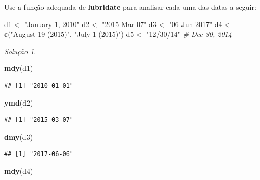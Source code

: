 \documentclass[
]{latex/krantz}
\newenvironment{Shaded}{\begin{snugshade}}{\end{snugshade}}
\newcommand{\CommentTok}[1]{\textcolor[rgb]{0.56,0.35,0.01}{\textit{#1}}}
\newcommand{\FunctionTok}[1]{\textcolor[rgb]{0.13,0.29,0.53}{\textbf{#1}}}
\newcommand{\NormalTok}[1]{#1}
\newcommand{\OtherTok}[1]{\textcolor[rgb]{0.56,0.35,0.01}{#1}}
\newcommand{\StringTok}[1]{\textcolor[rgb]{0.31,0.60,0.02}{#1}}
\theoremstyle{definition}
\theoremstyle{definition}
\theoremstyle{definition}
\theoremstyle{definition}
\theoremstyle{remark}
\newtheorem*{solution}{Solução}
\begin{document}
Use a função adequada de \textbf{lubridate} para analisar cada uma das datas a seguir:

\begin{Shaded}
\begin{Highlighting}[]
\NormalTok{d1 }\OtherTok{\textless{}{-}} \StringTok{"January 1, 2010"}
\NormalTok{d2 }\OtherTok{\textless{}{-}} \StringTok{"2015{-}Mar{-}07"}
\NormalTok{d3 }\OtherTok{\textless{}{-}} \StringTok{"06{-}Jun{-}2017"}
\NormalTok{d4 }\OtherTok{\textless{}{-}} \FunctionTok{c}\NormalTok{(}\StringTok{"August 19 (2015)"}\NormalTok{, }\StringTok{"July 1 (2015)"}\NormalTok{)}
\NormalTok{d5 }\OtherTok{\textless{}{-}} \StringTok{"12/30/14"} \CommentTok{\# Dec 30, 2014}
\end{Highlighting}
\end{Shaded}

\begin{solution}
\leavevmode

\begin{Shaded}
\begin{Highlighting}[]
\FunctionTok{mdy}\NormalTok{(d1)}
\end{Highlighting}
\end{Shaded}

\begin{verbatim}
## [1] "2010-01-01"
\end{verbatim}

\begin{Shaded}
\begin{Highlighting}[]
\FunctionTok{ymd}\NormalTok{(d2)}
\end{Highlighting}
\end{Shaded}

\begin{verbatim}
## [1] "2015-03-07"
\end{verbatim}

\begin{Shaded}
\begin{Highlighting}[]
\FunctionTok{dmy}\NormalTok{(d3)}
\end{Highlighting}
\end{Shaded}

\begin{verbatim}
## [1] "2017-06-06"
\end{verbatim}

\begin{Shaded}
\begin{Highlighting}[]
\FunctionTok{mdy}\NormalTok{(d4)}
\end{Highlighting}
\end{Shaded}


\end{solution}
\end{document}
